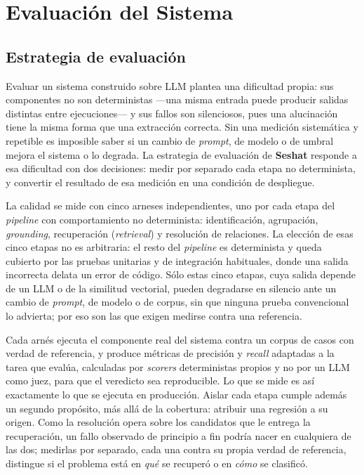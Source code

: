 \chapter{Evaluación del Sistema}
\label{ch:evaluacion}

\section{Estrategia de evaluación}

Evaluar un sistema construido sobre \ac{LLM} plantea una dificultad propia: sus componentes no
son deterministas —una misma entrada puede producir salidas distintas entre ejecuciones— y sus
fallos son silenciosos, pues una alucinación tiene la misma forma que una extracción correcta.
Sin una medición sistemática y repetible es imposible saber si un cambio de \textit{prompt}, de
modelo o de umbral mejora el sistema o lo degrada. La estrategia de evaluación de \textbf{Seshat}
responde a esa dificultad con dos decisiones: medir por separado cada etapa no determinista, y
convertir el resultado de esa medición en una condición de despliegue.

La calidad se mide con cinco arneses independientes, uno por cada etapa del \textit{pipeline} con
comportamiento no determinista: identificación, agrupación, \textit{grounding}, recuperación
(\textit{retrieval}) y resolución de relaciones. La elección de esas cinco etapas no es arbitraria:
el resto del \textit{pipeline}  es determinista y queda cubierto por las pruebas unitarias y de
integración habituales, donde una salida incorrecta delata un error de código. Sólo estas cinco
etapas, cuya salida depende de un \ac{LLM} o de la similitud vectorial, pueden degradarse en
silencio ante un cambio de \textit{prompt}, de modelo o de corpus, sin que ninguna prueba
convencional lo advierta; por eso son las que exigen medirse contra una referencia.

Cada arnés ejecuta el componente real del sistema contra un corpus de casos con verdad de referencia,
y produce métricas de precisión y \textit{recall} adaptadas a la tarea que evalúa, calculadas por
\textit{scorers} deterministas propios y no por un LLM como juez, para que el veredicto sea
reproducible. Lo que se mide es así exactamente lo que se ejecuta en producción. Aislar cada etapa
cumple además un segundo
propósito, más allá de la cobertura: atribuir una regresión a su origen. Como la resolución opera
sobre los candidatos que le entrega la recuperación, un fallo observado de principio a fin podría
nacer en cualquiera de las dos; medirlas por separado, cada una contra su propia verdad de referencia,
distingue si el problema está en \emph{qué} se recuperó o en \emph{cómo} se clasificó.

